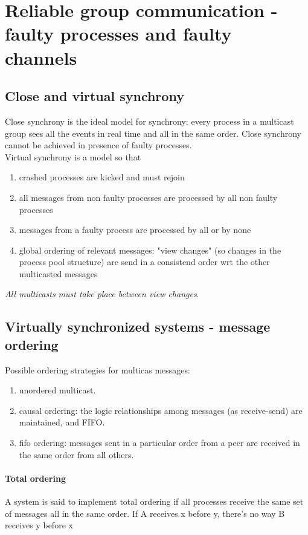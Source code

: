 \documentclass[10pt,a4paper]{article}
\begin{document}
		\section{Reliable group communication - faulty processes and faulty channels}
			\subsection{Close and virtual synchrony}
				Close synchrony is the ideal model for synchrony: every process in a multicast group sees all the events in real time and all in the same order. Close synchrony cannot be achieved in presence of faulty processes.\\
				Virtual synchrony is a model so that
				\begin{enumerate}
					\item crashed processes are kicked and must rejoin
					\item all messages from non faulty processes are processed by all non faulty processes
					\item messages from a faulty process are processed by all or by none
					\item global ordering of relevant messages: "view changes" (so changes in the process pool structure) are send in a consistend order wrt the other multicasted messages
				\end{enumerate}
				\emph{All multicasts must take place between view changes}.\\
			\subsection{Virtually synchronized systems - message ordering}
				Possible ordering strategies for multicas messages:
				\begin{enumerate}
					\item unordered multicast.
					\item causal ordering: the logic relationships among messages (as receive-send) are maintained, and FIFO. 
					\item fifo ordering: messages sent in a particular order from a peer are received in the same order from all others.
				\end{enumerate}
				\paragraph{Total ordering}
					A system is said to implement total ordering if all processes receive the same set of messages all in the same order. If A receives x before y, there's no way B receives y before x
\end{document}
